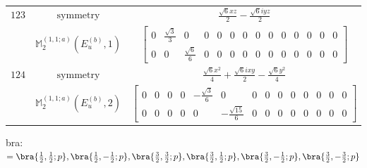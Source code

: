 \documentclass[fleqn,8pt,landscape]{jsarticle}
\begin{document}
\begin{longtable}{ccc}
$ 123 $ & $ \text{symmetry} $ & $ \frac{\sqrt{6} x z}{2} - \frac{\sqrt{6} i y z}{2} $ \\
$  $ & $ \mathbb{M}_{2}^{(1,1;a)}(E_{u}^{(b)},1) $ & $ \begin{bmatrix} 0 & \frac{\sqrt{3}}{3} & 0 & 0 & 0 & 0 & 0 & 0 & 0 & 0 & 0 & 0 & 0 & 0 \\ 0 & 0 & \frac{\sqrt{6}}{6} & 0 & 0 & 0 & 0 & 0 & 0 & 0 & 0 & 0 & 0 & 0 \end{bmatrix} $ \\ \hline
$ 124 $ & $ \text{symmetry} $ & $ \frac{\sqrt{6} x^{2}}{4} + \frac{\sqrt{6} i x y}{2} - \frac{\sqrt{6} y^{2}}{4} $ \\
$  $ & $ \mathbb{M}_{2}^{(1,1;a)}(E_{u}^{(b)},2) $ & $ \begin{bmatrix} 0 & 0 & 0 & 0 & - \frac{\sqrt{3}}{6} & 0 & 0 & 0 & 0 & 0 & 0 & 0 & 0 & 0 \\ 0 & 0 & 0 & 0 & 0 & - \frac{\sqrt{15}}{6} & 0 & 0 & 0 & 0 & 0 & 0 & 0 & 0 \end{bmatrix} $ \\ \hline
\end{longtable}
bra: $=\bra{\frac{1}{2},\frac{1}{2};p}, \bra{\frac{1}{2},- \frac{1}{2};p}, \bra{\frac{3}{2},\frac{3}{2};p}, \bra{\frac{3}{2},\frac{1}{2};p}, \bra{\frac{3}{2},- \frac{1}{2};p}, \bra{\frac{3}{2},- \frac{3}{2};p}$
\end{document}
